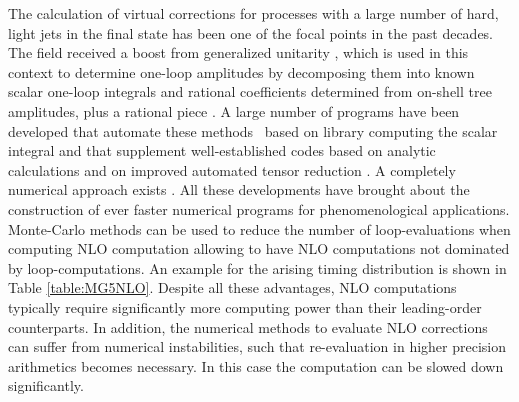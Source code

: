 \documentclass{article}
\begin{document}
The calculation of virtual corrections for processes with a large number
of hard, light jets in the final state has been one of the focal points 
in the past decades. The field received a boost from generalized unitarity 
\cite{Bern:1994cg,Bern:1994zx,Bern:1997sc}, which is used in this context
to determine one-loop amplitudes by decomposing them into known scalar 
one-loop integrals and rational coefficients determined from on-shell 
tree amplitudes, plus a rational piece \cite{Ossola:2006us,Forde:2007mi,
  Ellis:2007br,Ossola:2008xq,Ellis:2008ir,Peraro:2014cba,Hirschi:2016mdz}. A large number of programs have been 
developed that automate these methods~\cite{Berger:2008sj,Ellis:2008qc,Ellis:2009zw,Bevilacqua:2011xh,Hirschi:2011pa,Alwall:2014hca,Badger:2010nx,Cascioli:2011va,Cullen:2011kv,Fleischer:2011bi} based on library computing the scalar integral \cite{Ellis:2007qk,vanHameren:2010cp,Hahn:1998yk,Patel:2016fam,vanOldenborgh:1990yc} 
and that supplement well-established codes based on analytic calculations
\cite{MCFM,Campbell:2010ff,Campbell:2015qma} and on improved automated 
tensor reduction \cite{Denner:2005nn,Binoth:2005ff,Cullen:2011xs,Cullen:2014yla,
  Cascioli:2011va,Actis:2012qn}. A completely numerical approach exists \cite{Becker:2010ng,Becker:2011vg}. 
All these developments have brought about the construction of ever faster 
numerical programs for phenomenological applications. Monte-Carlo methods 
can be used to reduce the number of loop-evaluations when computing NLO computation \cite{Alwall:2014hca} allowing to have NLO computations not dominated by loop-computations. An example for the arising timing distribution
is shown in Table \ref{table:MG5NLO}. Despite all these advantages, NLO
computations typically require significantly more computing power
than their leading-order counterparts. In addition, the numerical methods
to evaluate NLO corrections can suffer from numerical instabilities, such that re-evaluation in higher precision arithmetics becomes necessary. In this case the computation can be slowed down significantly.
\end{document}
